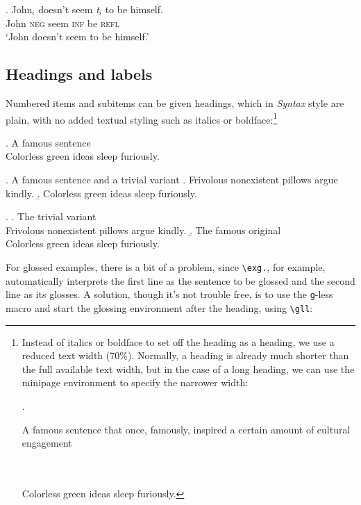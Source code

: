 \documentclass[letterpaper,12pt, twoside]{article}
\begin{document}
\exg. John$_i$ doesn't seem \emph{t}$_i$ to be himself. \\
John	\textsc{neg} seem {} \textsc{inf} be \textsc{refl} \\
`John doesn't seem to be himself.' \label{raising}


%


\subsection{Headings and labels}

Numbered items and subitems can be given headings, which in \emph{Syntax} style are plain, with no added textual styling such as italics or boldface:\footnote{Instead of italics or boldface to set off the heading as a heading, we use a reduced text width (70\%). Normally, a heading is already much shorter than the full available text width, but in the case of a long heading, we can use the minipage environment to specify the narrower width:

\ex.  
\begin{minipage}[t]{0.7\textwidth}
\raggedright A famous sentence that once, famously,  inspired a certain amount of cultural engagement \\\
\end{minipage}\\
Colorless green ideas sleep furiously. 

}

\ex.  A famous sentence\\
Colorless green ideas sleep furiously. 

\ex. A famous sentence and a trivial variant
\a. Frivolous nonexistent pillows argue kindly.
\b. Colorless green ideas sleep furiously.

\ex. 
\a. The trivial variant\\Frivolous nonexistent pillows argue kindly.
\b. The famous original\\Colorless green ideas sleep furiously.
 
 



For glossed examples, there is a bit of a problem, since  \verb|\exg.|, for example, automatically interprets the first line as the sentence to be glossed and the second line as its glosses. A solution, though it's not trouble free, is to use the \verb|g|-less macro and start the glossing environment after the heading, using  \verb|\gll|: 
\end{document}
